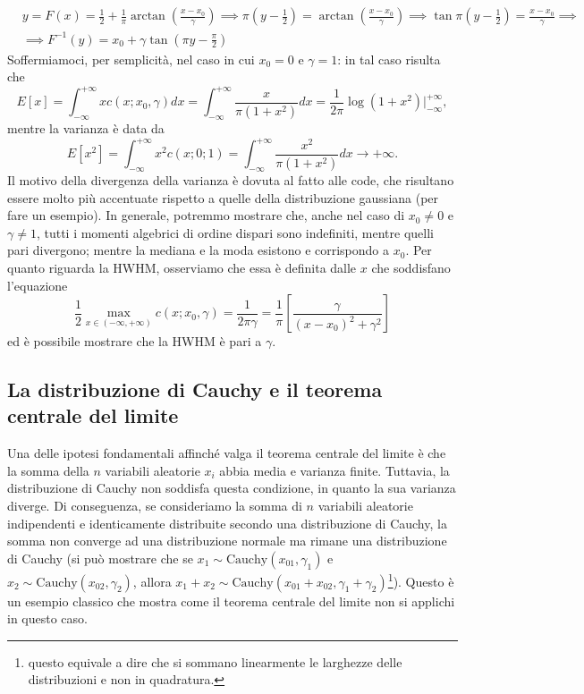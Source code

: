 \documentclass{report}
\begin{document}
\begin{align*}
	&y = F(x) = \frac{1}{2} + \frac{1}{\pi} \arctan{\left( \frac{x-x_0}{\gamma} \right)} \implies \pi(y - \frac{1}{2}) = \arctan{\left( \frac{x-x_0}{\gamma} \right)} \implies \tan{\pi(y - \frac{1}{2})} = \frac{x-x_0}{\gamma} \implies \\
	&\implies F^{-1}(y) = x_0 + \gamma \tan(\pi y - \frac{\pi}{2})
\end{align*}
Soffermiamoci, per semplicità, nel caso in cui $x_0 = 0$ e $\gamma = 1$: in tal caso risulta che
$$
E[x] = \int_{-\infty}^{+\infty} x c(x;x_0, \gamma)dx = \int_{-\infty}^{+\infty} \frac{x}{\pi(1+x^2)}dx = \frac{1}{2\pi} \log{(1+x^2)}\bigg|^{+\infty}_{-\infty},
$$
mentre la varianza è data da
$$
E[x^2] = \int_{-\infty}^{+\infty} x^2 c(x; 0; 1) = \int_{-\infty}^{+\infty} \frac{x^2}{\pi(1+x^2)}dx \to +\infty.
$$
Il motivo della divergenza della varianza è dovuta al fatto alle code, che risultano essere molto più accentuate rispetto a quelle della distribuzione gaussiana (per fare un esempio). In generale, potremmo mostrare che, anche nel caso di $x_0 \neq 0$ e $\gamma \neq 1$, tutti i momenti algebrici di ordine dispari sono indefiniti, mentre quelli pari divergono; mentre la mediana e la moda esistono e corrispondo a $x_0$. Per quanto riguarda la HWHM, osserviamo che essa è definita dalle $x$ che soddisfano l'equazione
$$
	\frac{1}{2} \max_{x \in (-\infty, +\infty)}{c(x; x_0, \gamma)} = \frac{1}{2\pi \gamma} = \frac{1}{\pi}\left[ \frac{\gamma}{(x-x_0)^2 + \gamma^2 }\right] 
$$
ed è possibile mostrare che la HWHM è pari a $\gamma$.
\subsection{La distribuzione di Cauchy e il teorema centrale del limite}

Una delle ipotesi fondamentali affinché valga il teorema centrale del limite è che la somma della $n$ variabili aleatorie $x_i$ abbia media e varianza finite. Tuttavia, la distribuzione di Cauchy non soddisfa questa condizione, in quanto la sua varianza diverge. Di conseguenza, se consideriamo la somma di $n$ variabili aleatorie indipendenti e identicamente distribuite secondo una distribuzione di Cauchy, la somma non converge ad una distribuzione normale ma rimane una distribuzione di Cauchy (si può mostrare che se $x_1 \sim \text{Cauchy}(x_{01}, \gamma_1)$ e $x_2 \sim \text{Cauchy}(x_{02}, \gamma_2)$, allora $x_1 + x_2 \sim \text{Cauchy}(x_{01}+x_{02}, \gamma_1 + \gamma_2)$\footnote{questo equivale a dire che si sommano linearmente le larghezze delle distribuzioni e non in quadratura.}). Questo è un esempio classico che mostra come il teorema centrale del limite non si applichi in questo caso. \\

\pagebreak
\printindex
\end{document}
